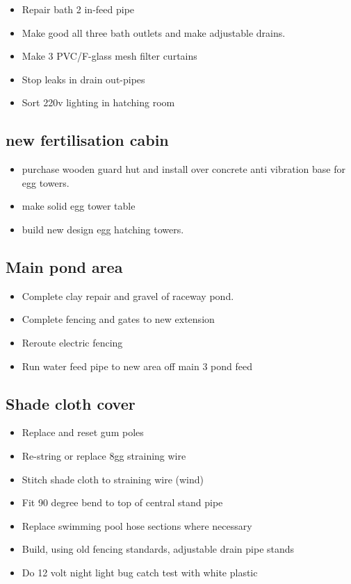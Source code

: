 \begin{itemize}
\item Repair bath 2 in-feed pipe
\item Make good all three bath outlets and make adjustable drains. 
\item Make 3 PVC/F-glass mesh filter curtains  
\item Stop leaks in drain out-pipes
\item Sort 220v lighting in hatching room
\end{itemize}

\subsection{new fertilisation cabin}
\begin{itemize}
\item purchase wooden guard hut and install over concrete anti vibration base for egg towers.
\item make solid egg tower table  
\item build new design egg hatching towers.
\end{itemize}


\subsection{Main pond area}     
\begin{itemize}
\item Complete clay repair and gravel of raceway pond.    
\item Complete fencing and gates to new extension   
\item Reroute electric fencing
\item Run water feed pipe to new area off main 3 pond feed
\end{itemize}

\subsection{Shade cloth cover}  
\begin{itemize}
\item Replace and reset gum poles  
\item Re-string or replace 8gg straining wire 
\item Stitch shade cloth to straining wire (wind)
\item Fit 90 degree bend to top of central stand pipe  
\item Replace swimming pool hose sections where necessary
\item Build, using old fencing standards, adjustable drain pipe stands
\item Do 12 volt night light bug catch test with white plastic 
\end{itemize}


